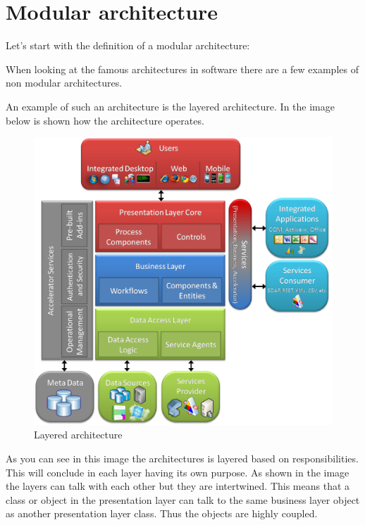 \chapter{Modular architecture}
\label{sec:ModularArchitecture}

Let's start with the definition of a modular architecture:

When looking at the famous architectures in software there are a few examples of non
modular architectures.

An example of such an architecture is the layered architecture. In the image below is shown how the architecture operates.

\begin{figure}[H]
	\includegraphics[width=\linewidth]{layered_architecture.png}
	\caption{Layered architecture \cite{layeredArchitecture}}
\end{figure}

As you can see in this image the architectures is layered based on responsibilities. This will conclude in each layer having its own purpose. As shown in the image the layers can talk with each other but they are intertwined. This means that a class or object in the presentation layer can talk to the same business layer object as another presentation layer class. Thus the objects are highly coupled.

